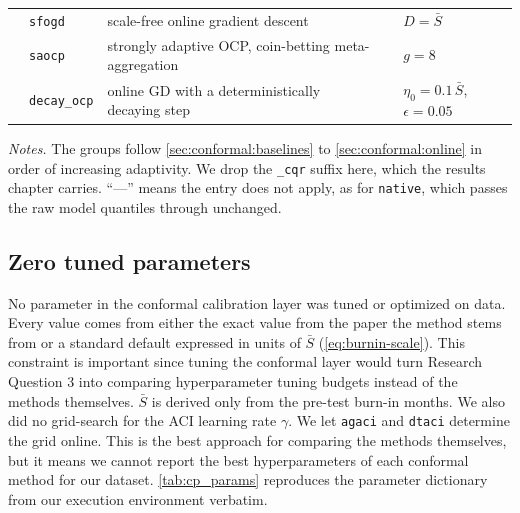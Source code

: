 \begin{table}[htbp]
{\begin{tabular}{@{}lllll@{}}
      & \texttt{sfogd}      & scale-free online gradient descent
        & \parencite{bhatnagar2023sfogd} & $D = \bar S$ \\
      & \texttt{saocp}      & strongly adaptive OCP, coin-betting meta-aggregation
        & \parencite{bhatnagar2023sfogd,jun2017cbce} & $g = 8$ \\
      & \texttt{decay\_ocp} & online GD with a deterministically decaying step
        & \parencite{angelopoulos2024decay} & $\eta_0 = 0.1\,\bar S$, $\epsilon = 0.05$ \\
    \bottomrule
  \end{tabular}%
  }

\vspace{4pt}
{\footnotesize
\begin{minipage}{0.98\textwidth}
\textit{Notes.} The groups follow \cref{sec:conformal:baselines} to \cref{sec:conformal:online} in order of increasing adaptivity. We drop the \texttt{\_cqr} suffix here, which the results chapter carries. ``---'' means the entry does not apply, as for \texttt{native}, which passes the raw model quantiles through unchanged.
\end{minipage}}
\end{table}

\subsection{Zero tuned parameters}
\label{sec:conformal:params}
No parameter in the conformal calibration layer was tuned or optimized on
data. Every value comes from either the exact value from the paper the method stems from or a standard default expressed in units of $\bar{S}$ (\cref{eq:burnin-scale}). This constraint is important since tuning the conformal layer would turn Research Question 3 into comparing hyperparameter tuning budgets instead of the methods themselves. $\bar{S}$ is derived only from the pre-test burn-in months. We also did
no grid-search for the ACI learning rate $\gamma$. We let \texttt{agaci}
and \texttt{dtaci} determine the grid online. This is the best approach for comparing the methods themselves, but it means we cannot report the best hyperparameters of each conformal method for our dataset. \cref{tab:cp_params} reproduces the parameter dictionary from our execution environment verbatim.

